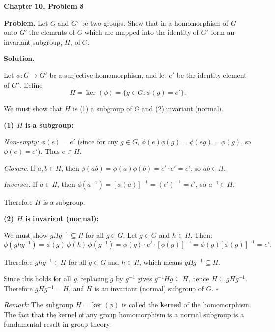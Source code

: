 \documentclass[12pt]{article}
\begin{document}
\begin{center}
{\Large\bfseries Chapter 10, Problem 8}
\end{center}

\noindent\textbf{Problem.} Let $G$ and $G'$ be two groups. Show that in a homomorphism of $G$ onto $G'$ the elements of $G$ which are mapped into the identity of $G'$ form an invariant subgroup, $H$, of $G$.

\bigskip
\noindent\textbf{Solution.}

Let $\phi: G \to G'$ be a surjective homomorphism, and let $e'$ be the identity element of $G'$. Define
\[
H = \ker(\phi) = \{g \in G : \phi(g) = e'\}.
\]

We must show that $H$ is (1) a subgroup of $G$ and (2) invariant (normal).

\medskip
\noindent\textbf{(1) $H$ is a subgroup:}

\textit{Non-empty:} $\phi(e) = e'$ (since for any $g \in G$, $\phi(e)\phi(g) = \phi(eg) = \phi(g)$, so $\phi(e) = e'$). Thus $e \in H$.

\textit{Closure:} If $a, b \in H$, then $\phi(ab) = \phi(a)\phi(b) = e' \cdot e' = e'$, so $ab \in H$.

\textit{Inverses:} If $a \in H$, then $\phi(a^{-1}) = [\phi(a)]^{-1} = (e')^{-1} = e'$, so $a^{-1} \in H$.

Therefore $H$ is a subgroup.

\medskip
\noindent\textbf{(2) $H$ is invariant (normal):}

We must show $gHg^{-1} \subseteq H$ for all $g \in G$. Let $g \in G$ and $h \in H$. Then:
\[
\phi(ghg^{-1}) = \phi(g)\,\phi(h)\,\phi(g^{-1}) = \phi(g) \cdot e' \cdot [\phi(g)]^{-1} = \phi(g)[\phi(g)]^{-1} = e'.
\]

Therefore $ghg^{-1} \in H$ for all $g \in G$ and $h \in H$, which means $gHg^{-1} \subseteq H$.

Since this holds for all $g$, replacing $g$ by $g^{-1}$ gives $g^{-1}Hg \subseteq H$, hence $H \subseteq gHg^{-1}$. Therefore $gHg^{-1} = H$, and $H$ is an invariant (normal) subgroup of $G$. $\square$

\medskip
\noindent\textit{Remark:} The subgroup $H = \ker(\phi)$ is called the \textbf{kernel} of the homomorphism. The fact that the kernel of any group homomorphism is a normal subgroup is a fundamental result in group theory.
\end{document}
